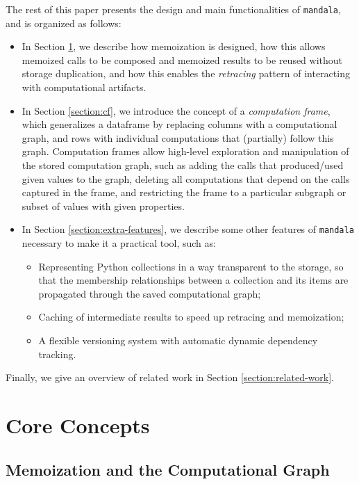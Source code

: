 The rest of this paper presents the design and main functionalities of
\texttt{mandala}, and is organized as follows:
\begin{itemize}
\item In Section \ref{section:core-concepts}, we describe how memoization is
designed, how this allows memoized calls to be composed and memoized results to
be reused without storage duplication, and how this enables the \emph{retracing}
pattern of interacting with computational artifacts.
\item In Section \ref{section:cf}, we introduce the concept of a
\emph{computation frame}, which generalizes a dataframe by replacing columns
with a computational graph, and rows with individual computations that
(partially) follow this graph. Computation frames allow high-level exploration
and manipulation of the stored computation graph, such as adding the calls that
produced/used given values to the graph, deleting all computations that depend
on the calls captured in the frame, and restricting the frame to a particular
subgraph or subset of values with given properties.
\item In Section \ref{section:extra-features}, we describe some other features of
\texttt{mandala} necessary to make it a practical tool, such as:
\begin{itemize}
\item Representing Python collections in a way transparent to the storage, so
that the membership relationships between a collection and its items are
propagated through the saved computational graph;
\item Caching of intermediate results to speed up retracing and memoization;
\item A flexible versioning system with automatic dynamic dependency tracking.
\end{itemize}
\end{itemize}

Finally, we give an overview of related work in Section \ref{section:related-work}.

\section{Core Concepts}
\label{section:core-concepts}

\subsection{Memoization and the Computational Graph}

